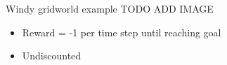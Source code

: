 \bgroup
\begin{frame}{Windy gridworld example}
TODO ADD IMAGE\\
\begin{itemize}
\item Reward = -1 per time step until reaching goal
\item Undiscounted
\end{itemize}
\end{frame}
\egroup